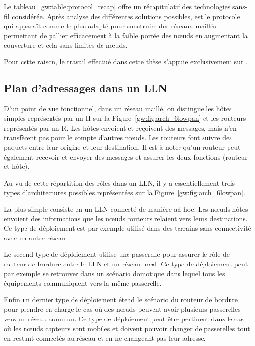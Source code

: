 Le tableau~\ref{gw:table:protocol_recap} offre un récapitulatif des technologies sans-fil considérée.
Après analyse des différentes solutions possibles, \ieee{} est le protocole qui apparaît comme le plus adapté pour construire des réseaux maillés permettant de pallier efficacement à la faible portée des nœuds en augmentant la couverture et cela sans limites de nœuds.

Pour cette raison, le travail effectué dans cette thèse s'appuie exclusivement sur \ieee{}.

\subsection{Plan d'adressages dans un \ac{LLN}}
\label{gw:ip}

D'un point de vue fonctionnel, dans un réseau maillé, on distingue les hôtes simples représentés par un H sur la Figure~\ref{gw:fig:arch_6lowpan} et les routeurs représentés par un R.
Les hôtes envoient et reçoivent des messages, mais n'en transfèrent pas pour le compte d'autres nœuds.
Les routeurs font suivre des paquets entre leur origine et leur destination.
Il est à noter qu'un routeur peut également recevoir et envoyer des messages et assurer les deux fonctions (routeur et hôte).

Au vu de cette répartition des rôles dans un \ac{LLN}, il y a essentiellement trois types d'architectures possibles représentées sur la Figure~\ref{gw:fig:arch_6lowpan}.

La plus simple consiste en un \ac{LLN} connecté de manière ad hoc.
Les nœuds hôtes envoient des informations que les nœuds routeurs relaient vers leurs destinations.
Ce type de déploiement est par exemple utilisé dans des terrains sans connectivité avec un autre réseau~\cite{werner2006deploying}.

Le second type de déploiement utilise une passerelle pour assurer le rôle de routeur de bordure entre le \ac{LLN} et un réseau local.
Ce type de déploiement peut par exemple se retrouver dans un scénario domotique dans lequel tous les équipements communiquent vers la même passerelle.

Enfin un dernier type de déploiement étend le scénario du routeur de bordure pour prendre en charge le cas où des nœuds peuvent avoir plusieurs passerelles vers un réseau commun.
Ce type de déploiement peut être pertinent dans le cas où les nœuds capteurs sont mobiles et doivent pouvoir changer de passerelles tout en restant connectés au réseau et en ne changeant pas leur adresse.

